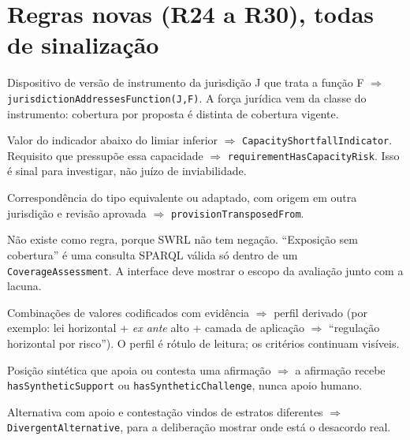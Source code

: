 \documentclass[12pt,a4paper,oneside,english,brazil]{abntex2}
\begin{document}
\section{Regras novas (R24 a R30), todas de sinalização}
\begin{description}[leftmargin=*, style=nextline]
  \item[R24 FunctionCoverage] Dispositivo de versão de instrumento da jurisdição J que trata a função F $\Rightarrow$ \texttt{jurisdictionAddressesFunction(J,F)}. A força jurídica vem da classe do instrumento: cobertura por proposta é distinta de cobertura vigente.
  \item[R25 CapacityShortfall] Valor do indicador abaixo do limiar inferior $\Rightarrow$ \texttt{CapacityShortfallIndicator}. Requisito que pressupõe essa capacidade $\Rightarrow$ \texttt{requirementHasCapacityRisk}. Isso é sinal para investigar, não juízo de inviabilidade.
  \item[R26 Transposition] Correspondência do tipo equivalente ou adaptado, com origem em outra jurisdição e revisão aprovada $\Rightarrow$ \texttt{provisionTransposedFrom}.
  \item[R27] Não existe como regra, porque SWRL não tem negação. ``Exposição sem cobertura'' é uma consulta SPARQL válida só dentro de um \texttt{CoverageAssessment}. A interface deve mostrar o escopo da avaliação junto com a lacuna.
  \item[R28 DesignProfile] Combinações de valores codificados com evidência $\Rightarrow$ perfil derivado (por exemplo: lei horizontal + \emph{ex ante} alto + camada de aplicação $\Rightarrow$ ``regulação horizontal por risco''). O perfil é rótulo de leitura; os critérios continuam visíveis.
  \item[R29 SyntheticSupport] Posição sintética que apoia ou contesta uma afirmação $\Rightarrow$ a afirmação recebe \texttt{hasSyntheticSupport} ou \texttt{hasSyntheticChallenge}, nunca apoio humano.
  \item[R30 DivergentAlternative] Alternativa com apoio e contestação vindos de estratos diferentes $\Rightarrow$ \texttt{Divergent\allowbreak Alternative}, para a deliberação mostrar onde está o desacordo real.
\end{description}

\end{document}
